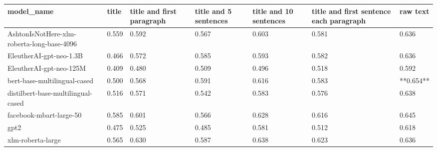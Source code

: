 \begin{tabular}{lllllll}
\toprule
                                model\_name & title & title and first paragraph & title and 5 sentences & title and 10 sentences & title and first sentence each paragraph &  raw text \\
\midrule
AshtonIsNotHere-xlm-roberta-long-base-4096 & 0.559 &                     0.592 &                 0.567 &                  0.603 &                                   0.581 &     0.636 \\
                   EleutherAI-gpt-neo-1.3B & 0.466 &                     0.572 &                 0.585 &                  0.593 &                                   0.582 &     0.636 \\
                   EleutherAI-gpt-neo-125M & 0.409 &                     0.480 &                 0.509 &                  0.496 &                                   0.518 &     0.592 \\
              bert-base-multilingual-cased & 0.500 &                     0.568 &                 0.591 &                  0.616 &                                   0.583 & **0.654** \\
        distilbert-base-multilingual-cased & 0.516 &                     0.571 &                 0.542 &                  0.583 &                                   0.576 &     0.638 \\
                   facebook-mbart-large-50 & 0.585 &                     0.601 &                 0.566 &                  0.628 &                                   0.616 &     0.645 \\
                                      gpt2 & 0.475 &                     0.525 &                 0.485 &                  0.581 &                                   0.512 &     0.618 \\
                         xlm-roberta-large & 0.565 &                     0.630 &                 0.587 &                  0.638 &                                   0.623 &     0.636 \\
\bottomrule
\end{tabular}
